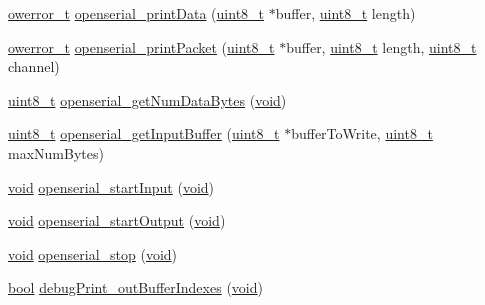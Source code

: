 \begin{DoxyCompactItemize}
\item 
\hyperlink{opendefs_8h_af20b7c3ed9d2ba19e56a309ad9314803}{owerror\+\_\+t} \hyperlink{group___open_serial_ga773cc9fae5d0477d9eed107dce419c33}{openserial\+\_\+print\+Data} (\hyperlink{_p_e___types_8h_aba7bc1797add20fe3efdf37ced1182c5}{uint8\+\_\+t} $\ast$buffer, \hyperlink{_p_e___types_8h_aba7bc1797add20fe3efdf37ced1182c5}{uint8\+\_\+t} length)
\item 
\hyperlink{opendefs_8h_af20b7c3ed9d2ba19e56a309ad9314803}{owerror\+\_\+t} \hyperlink{group___open_serial_ga6e474f4ac39a88e72067f4d0d56fa06a}{openserial\+\_\+print\+Packet} (\hyperlink{_p_e___types_8h_aba7bc1797add20fe3efdf37ced1182c5}{uint8\+\_\+t} $\ast$buffer, \hyperlink{_p_e___types_8h_aba7bc1797add20fe3efdf37ced1182c5}{uint8\+\_\+t} length, \hyperlink{_p_e___types_8h_aba7bc1797add20fe3efdf37ced1182c5}{uint8\+\_\+t} channel)
\item 
\hyperlink{_p_e___types_8h_aba7bc1797add20fe3efdf37ced1182c5}{uint8\+\_\+t} \hyperlink{group___open_serial_gac01eb6d59343d66884a8e938cca03b09}{openserial\+\_\+get\+Num\+Data\+Bytes} (\hyperlink{usb__devapi_8h_afabf60e7f57651d6d595a02c75f07cd0}{void})
\item 
\hyperlink{_p_e___types_8h_aba7bc1797add20fe3efdf37ced1182c5}{uint8\+\_\+t} \hyperlink{group___open_serial_gab42ae512b3e44f2f6acb84188dac30f7}{openserial\+\_\+get\+Input\+Buffer} (\hyperlink{_p_e___types_8h_aba7bc1797add20fe3efdf37ced1182c5}{uint8\+\_\+t} $\ast$buffer\+To\+Write, \hyperlink{_p_e___types_8h_aba7bc1797add20fe3efdf37ced1182c5}{uint8\+\_\+t} max\+Num\+Bytes)
\item 
\hyperlink{usb__devapi_8h_afabf60e7f57651d6d595a02c75f07cd0}{void} \hyperlink{group___open_serial_gabcc1ef759aa48467dd33d8f172d453db}{openserial\+\_\+start\+Input} (\hyperlink{usb__devapi_8h_afabf60e7f57651d6d595a02c75f07cd0}{void})
\item 
\hyperlink{usb__devapi_8h_afabf60e7f57651d6d595a02c75f07cd0}{void} \hyperlink{group___open_serial_gaf25875805325e15644a0cc1ddf2d1ad7}{openserial\+\_\+start\+Output} (\hyperlink{usb__devapi_8h_afabf60e7f57651d6d595a02c75f07cd0}{void})
\item 
\hyperlink{usb__devapi_8h_afabf60e7f57651d6d595a02c75f07cd0}{void} \hyperlink{group___open_serial_ga3459b731e462b664947a4e3260c51512}{openserial\+\_\+stop} (\hyperlink{usb__devapi_8h_afabf60e7f57651d6d595a02c75f07cd0}{void})
\item 
\hyperlink{_p_e___types_8h_a97a80ca1602ebf2303258971a2c938e2}{bool} \hyperlink{group___open_serial_ga99f5ed8c81eec2120d38308b51129cec}{debug\+Print\+\_\+out\+Buffer\+Indexes} (\hyperlink{usb__devapi_8h_afabf60e7f57651d6d595a02c75f07cd0}{void})

\end{DoxyCompactItemize}
